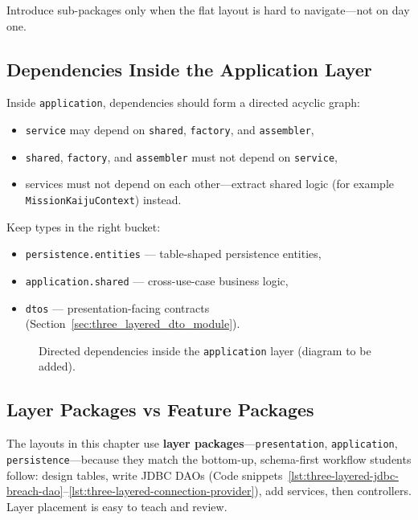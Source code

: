 Introduce sub-packages only when the flat layout is hard to navigate---not on day one.

\subsection{Dependencies Inside the Application Layer}
\label{sec:three_layered_application_deps}

Inside \texttt{application}, dependencies should form a directed acyclic graph:
\begin{itemize}
    \item \texttt{service} may depend on \texttt{shared}, \texttt{factory}, and \texttt{assembler},
    \item \texttt{shared}, \texttt{factory}, and \texttt{assembler} must not depend on \texttt{service},
    \item services must not depend on each other---extract shared logic (for example \texttt{MissionKaijuContext}) instead.
\end{itemize}

Keep types in the right bucket:
\begin{itemize}
    \item \texttt{persistence.entities} --- table-shaped persistence entities,
    \item \texttt{application.shared} --- cross-use-case business logic,
    \item \texttt{dtos} --- presentation-facing contracts (Section~\ref{sec:three_layered_dto_module}).
\end{itemize}

\begin{figure}[htbp]
\centering
{}
\caption{Directed dependencies inside the \texttt{application} layer (diagram to be added).}
\label{fig:three_layered_application_dag}
\end{figure}

\subsection{Layer Packages vs Feature Packages}
\label{sec:three_layered_layers_vs_features}

The layouts in this chapter use \textbf{layer packages}---\texttt{presentation}, \texttt{application}, \texttt{persistence}---because they match the bottom-up, schema-first workflow students follow: design tables, write JDBC DAOs (Code snippets~\ref{lst:three-layered-jdbc-breach-dao}--\ref{lst:three-layered-connection-provider}), add services, then controllers. Layer placement is easy to teach and review.

